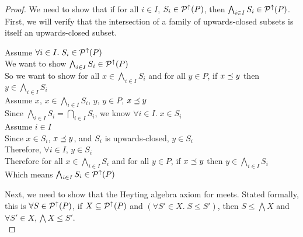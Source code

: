 \begin{proof}
We need to show that if for all $i \in I$, $S_i \in \mathcal{P}^{\uparrow}({P})$, 
then $\bigwedge_{i \in I} S_i \in \mathcal{P}^{\uparrow}({P})$. First, we will verify that 
the intersection of a family of upwards-closed subsets is itself an
upwards-closed subset. 

\begin{tabbedproof}
\oo Assume $\forall i \in I.\; S_i \in \mathcal{P}^{\uparrow}({P})$ \\
\ooo We want to show $\bigwedge_{i \in I} S_i \in \mathcal{P}^{\uparrow}({P})$ \\ 
\ooo So we want to show for all $x \in \bigwedge_{i \in I} S_i$ and for all $y \in P$, if $x \preceq y$ then $y \in \bigwedge_{i \in I} S_i$ \\
\ooo Assume $x$, $x \in \bigwedge_{i \in I} S_i$, $y$, $y \in P$, $x \preceq y$ \\
\oooo Since $\bigwedge_{i \in I} S_i = \bigcap_{i \in I} S_i$, we know 
      $\forall i \in I.\; x \in S_i$ \\
\oooo Assume $i \in I$ \\
\ooooo Since $x \in S_i$, $x \preceq y$, and $S_i$ is upwards-closed, $y \in S_i$ \\
\oooo Therefore, $\forall i \in I$, $y \in S_i$ \\
\ooo Therefore for all $x \in \bigwedge_{i \in I} S_i$ and for all $y \in P$, if $x \preceq y$ then $y \in \bigwedge_{i \in I} S_i$ \\
\ooo Which means $\bigwedge_{i \in I} S_i \in \mathcal{P}^{\uparrow}({P})$ \\ 
\end{tabbedproof}

\noindent Next, we need to show that the Heyting algebra axiom for meets. 
Stated formally,
this is $\forall S \in \mathcal{P}^{\uparrow}({P})$, if $X \subseteq
\mathcal{P}^{\uparrow}({P})$ and $(\forall S' \in X.\; S \leq S')$, then $S
\leq \bigwedge X$ and $\forall S' \in X, \bigwedge X \leq S'$.
\\


\end{proof}

